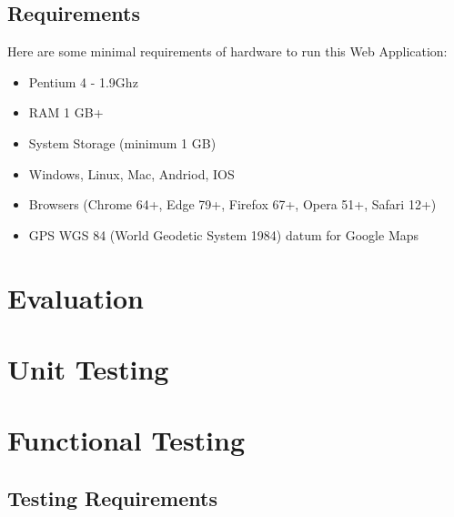 \subsection{Requirements}
Here are some minimal requirements of hardware to run this Web Application:
\begin{itemize}
	\item Pentium 4 - 1.9Ghz  
	\item RAM 1 GB+ 
	\item System Storage (minimum 1 GB)
	\item Windows, Linux, Mac, Andriod, IOS
	\item Browsers (Chrome 64+, Edge 79+, Firefox 67+, Opera 51+, Safari 12+)
	\item GPS WGS 84 (World Geodetic System 1984) datum for Google Maps 
\end{itemize}



\section{Evaluation}
\section{Unit Testing}
\section{Functional Testing}
\subsection{Testing Requirements}
